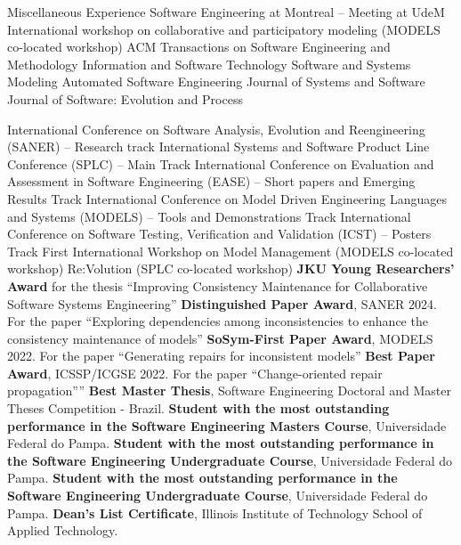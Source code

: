 \begin{rubric}{Miscellaneous Experience}
\entry*[2025 -- $\cdots$] Software Engineering at Montreal -- Meeting at UdeM
\entry*[2024 -- $\cdots$] International workshop on collaborative and participatory modeling (MODELS co-located workshop) 
\entry*[2025 -- $\cdots$] ACM Transactions on Software Engineering and Methodology
\entry*[2025 -- $\cdots$] Information and Software Technology
\entry*[2024 -- $\cdots$] Software and Systems Modeling
\entry*[2024 -- $\cdots$] Automated Software Engineering
\entry*[2023 -- $\cdots$] Journal of Systems and Software
\entry*[2022 -- $\cdots$] Journal of Software: Evolution and Process

\entry*[2025 -- $\cdots$] International Conference on Software Analysis, Evolution and Reengineering (SANER) -- Research track
\entry*[2025 -- $\cdots$]  International Systems and Software Product Line Conference (SPLC) -- Main Track
\entry*[2025 -- $\cdots$]  International Conference on Evaluation and Assessment in Software Engineering (EASE) -- Short papers and Emerging Results Track
\entry*[2025 -- $\cdots$]  International Conference on Model Driven Engineering Languages and Systems (MODELS) -- Tools and Demonstrations Track
\entry*[2025 -- $\cdots$] International Conference on Software Testing, Verification and Validation (ICST) -- Posters Track
\entry*[2024 -- $\cdots$] First International Workshop on Model Management (MODELS co-located workshop) 
\entry*[2023 -- $\cdots$] Re:Volution (SPLC co-located workshop)
\entry*[2025] \textbf{JKU Young Researchers' Award} for the thesis ``Improving Consistency Maintenance for Collaborative Software Systems Engineering'' 
\entry*[2024] \textbf{Distinguished Paper Award}, SANER 2024. For the paper ``Exploring dependencies among inconsistencies to enhance the consistency maintenance of models''%
\entry*[2022] \textbf{SoSym-First Paper Award}, MODELS 2022. For the paper ``Generating repairs for inconsistent models''%
\entry*[2022] \textbf{Best Paper Award}, ICSSP/ICGSE 2022. For the paper ``Change-oriented repair propagation”''%
\entry*[2021]
\textbf{Best Master Thesis}, Software Engineering Doctoral and Master Theses Competition - Brazil.
\entry*[2019]
\textbf{Student with the most outstanding performance in the Software Engineering Masters Course}, Universidade Federal do Pampa.
\entry*[2018]
\textbf{Student with the most outstanding performance in the Software Engineering Undergraduate Course}, Universidade Federal do Pampa.
\entry*[2016]
\textbf{Student with the most outstanding performance in the Software Engineering Undergraduate Course}, Universidade Federal do Pampa.
\entry*[2014] \textbf{Dean's List Certificate}, Illinois Institute of Technology School of Applied Technology.


\end{rubric}